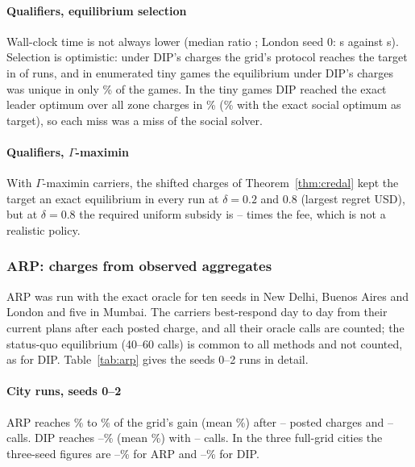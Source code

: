 \documentclass[preprint,12pt]{elsarticle}
\theoremstyle{definition}
\theoremstyle{remark}
\begin{document}
\paragraph{Qualifiers, equilibrium selection} Wall-clock time is not always lower (median ratio \DipTimeMed; London seed 0: \DipLondonTime{} s against \DipLondonGridTime{} s). Selection is optimistic: under DIP's charges the grid's protocol reaches the target in \DipSelSame{} of \DipRuns{} runs, and in \DipTinyN{} enumerated tiny games the equilibrium under DIP's charges was unique in only \DipTinyUniquePct\% of the games. In the tiny games DIP reached the exact leader optimum over all zone charges in \DipTinyHitPct\% (\DipTinyHitXPct\% with the exact social optimum as target), so each miss was a miss of the social solver.

\paragraph{Qualifiers, $\Gamma$-maximin} With $\Gamma$-maximin carriers, the shifted charges of Theorem~\ref{thm:credal} kept the target an exact equilibrium in every run at $\delta=0.2$ and $0.8$ (largest regret \DipCredalRegret{} USD), but at $\delta=0.8$ the required uniform subsidy is \DipCredalSubMin--\DipCredalSubMax{} times the fee, which is not a realistic policy.

\subsubsection{ARP: charges from observed aggregates}\label{sec:res-arp}

ARP was run with the exact oracle for ten seeds in New Delhi, Buenos Aires and London and five in Mumbai. The carriers best-respond day to day from their current plans after each posted charge, and all their oracle calls are counted; the status-quo equilibrium (40--60 calls) is common to all methods and not counted, as for DIP. Table~\ref{tab:arp} gives the seeds 0--2 runs in detail.


\paragraph{City runs, seeds 0--2} ARP reaches \ArpGainMin\% to \ArpGainMax\% of the grid's gain (mean \ArpGainMean\%) after \ArpRoundsMin--\ArpRoundsMax{} posted charges and \ArpCallsMin--\ArpCallsMax{} calls. DIP reaches \ArpDipGainMin--\ArpDipGainMax\% (mean \ArpDipGainMean\%) with \ArpDipCallsMin--\ArpDipCallsMax{} calls. In the three full-grid cities the three-seed figures are \ArpFullArpMin--\ArpFullArpMax\% for ARP and \ArpFullDipMin--\ArpFullDipMax\% for DIP.
\end{document}
